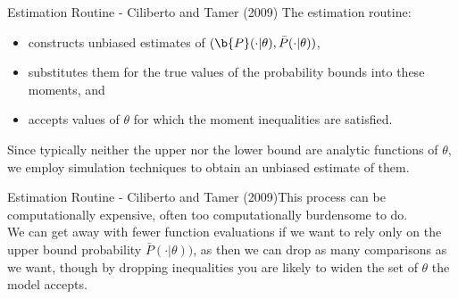 \documentclass[xcolor=pdftex,dvipsnames,table,mathserif]{beamer}
\begin{document}
\begin{frame}{Estimation Routine - Ciliberto and Tamer (2009)}
The estimation routine:
\begin{itemize}
\item constructs unbiased estimates of $(\b{P}(\cdot|\theta),\bar{P}(\cdot|\theta))$, 
\item substitutes them for the true values of the probability bounds into these moments, and
\item accepts values of  $\theta$ for which the moment inequalities are satisfied.
\end{itemize}
\vspace{0.1in}
Since typically neither the upper nor the lower bound are
analytic functions of $\theta$, we employ simulation techniques to obtain an unbiased estimate of them.\\
\vspace{0.2in}
\end{frame}
\begin{frame}{Estimation Routine - Ciliberto and Tamer (2009)}This process can be computationally expensive, often too computationally burdensome
to do. \\
\vspace{0.2in}
We can get away with fewer function evaluations if
we want to rely only on the upper bound probability $\bar{P}( \cdot | \theta))$, as
then we can drop as many comparisons as we want, though by
dropping inequalities you are likely to widen the set of  $\theta$ the
model accepts.
\end{frame}
\end{document}

